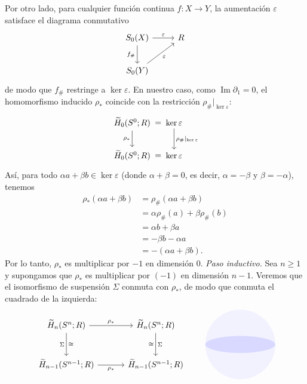 \begin{dem}
Por otro lado, para cualquier función continua $f \colon X \to Y$, la aumentación $\varepsilon$ satisface el diagrama conmutativo
\[
\begin{tikzcd}[column sep=2.6em, row sep=2.2em]
S_0(X) \arrow[r, "\varepsilon"] \arrow[d, "f_\#"'] & R \\
S_0(Y) \arrow[ur, "\varepsilon"'] &
\end{tikzcd}
\]
de modo que $f_\#$ restringe a $\ker\varepsilon$. En nuestro caso, como $\operatorname{Im}\partial_1 = 0$, el homomorfismo inducido $\rho_*$ coincide con la restricción $\rho_\#|_{\ker\varepsilon}$:
\[
\begin{tikzcd}[column sep=1em, row sep=2.0em]
\widetilde{H}_0(S^0; R) \arrow[r, phantom, "="] \arrow[d, "\rho_*"'] & \ker\varepsilon \arrow[d, "\rho_\#|_{\ker\varepsilon}"] \\
\widetilde{H}_0(S^0; R) \arrow[r, phantom, "="] & \ker\varepsilon
\end{tikzcd}
\]
Así, para todo $\alpha a + \beta b \in \ker\varepsilon$ (donde $\alpha + \beta = 0$, es decir, $\alpha = -\beta$ y $\beta = -\alpha$), tenemos
\begin{align*}
\rho_*(\alpha a + \beta b) &= \rho_\#(\alpha a + \beta b) \\
&= \alpha\rho_\#(a) + \beta\rho_\#(b) \\
&= \alpha b + \beta a \\
&= -\beta b - \alpha a \\
&= -(\alpha a + \beta b).
\end{align*}
Por lo tanto, $\rho_*$ es multiplicar por $-1$ en dimensión $0$.
\smallskip
\noindent\textit{Paso inductivo.} Sea $n \geq 1$ y supongamos que $\rho_*$ es multiplicar por $(-1)$ en dimensión $n - 1$. Veremos que el isomorfismo de suspensión $\Sigma$ conmuta con $\rho_*$, de modo que conmuta el cuadrado de la izquierda:
\[
\begin{tikzcd}[column sep=3.2em, row sep=2.8em, baseline=(current bounding box.center)]
\widetilde{H}_n(S^n; R)
    \arrow[r, "\rho_*"]
    \arrow[d, "\Sigma"', "\cong"]
& \widetilde{H}_n(S^n; R)
    \arrow[d, "\Sigma", "\cong"'] \\
\widetilde{H}_{n-1}(S^{n-1}; R)
    \arrow[r, "\rho_*"']
& \widetilde{H}_{n-1}(S^{n-1}; R)
\end{tikzcd}
\hspace{2.2em}
\begin{tikzpicture}[baseline=(current bounding box.center), scale=0.95]
    \fill[blue!5] (0, 0) circle (1.55);
    \fill[blue!15] (0, 0) ellipse [x radius=1.55, y radius=0.38];


\end{tikzpicture}\]
\end{dem}
